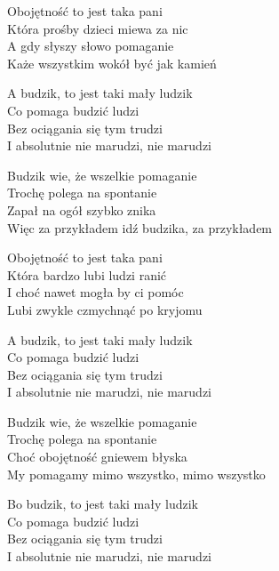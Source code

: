 \begin{text}
    Obojętność to jest taka pani\\
    Która prośby dzieci miewa za nic\\
    A gdy słyszy słowo pomaganie\\
    Każe wszystkim wokół być jak kamień

    A budzik, to jest taki mały ludzik\\
    Co pomaga budzić ludzi\\
    Bez ociągania się tym trudzi\\
    I absolutnie nie marudzi, nie marudzi

    Budzik wie, że wszelkie pomaganie\\
    Trochę polega na spontanie\\
    Zapał na ogół szybko znika\\
    Więc za przykładem idź budzika, za przykładem

    Obojętność to jest taka pani\\
    Która bardzo lubi ludzi ranić\\
    I choć nawet mogła by ci pomóc\\
    Lubi zwykle czmychnąć po kryjomu

    A budzik, to jest taki mały ludzik\\
    Co pomaga budzić ludzi\\
    Bez ociągania się tym trudzi\\
    I absolutnie nie marudzi, nie marudzi

    Budzik wie, że wszelkie pomaganie\\
    Trochę polega na spontanie\\
    Choć obojętność gniewem błyska\\
    My pomagamy mimo wszystko, mimo wszystko

    Bo budzik, to jest taki mały ludzik\\
    Co pomaga budzić ludzi\\
    Bez ociągania się tym trudzi\\
    I absolutnie nie marudzi, nie marudzi
\end{text}
\begin{chord}

\end{chord}